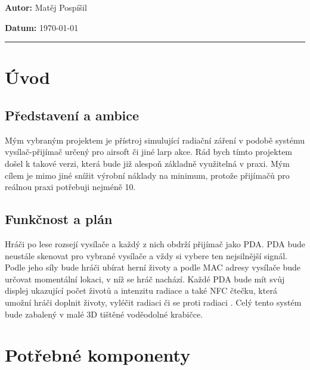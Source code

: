 \documentclass[11pt,a4paper]{article}
\begin{document}

\vspace{0.4em}


\vspace{0.3em}


\vspace{0.7em}

\noindent \textbf{Autor:} Matěj Pospíšil

\noindent \textbf{Datum:} \today

\vspace{1.2em}
\hrule
\vspace{1.7em}

\tableofcontents

\newpage

\section{Úvod}
\subsection{Představení a ambice}
Mým vybraným projektem je přístroj simulující radiační záření v podobě systému vysílač-přijímač určený pro airsoft či jiné larp akce. Rád bych tímto projektem došel k takové verzi, která bude již alespoň základně využitelná v praxi. Mým cílem je mimo jiné snížit výrobní náklady na minimum, protože přijímačů pro reálnou praxi potřebuji nejméně 10.
\subsection{Funkčnost a plán}
Hráči po lese rozsejí vysílače a každý z nich obdrží přijímač jako PDA. PDA bude neustále skenovat pro vybrané vysílače a vždy si vybere ten nejsilnější signál. Podle jeho síly bude hráči ubírat herní životy a podle MAC adresy vysílače bude určovat momentální lokaci, v níž se hráč nachází. Každé PDA bude mít svůj displej ukazující počet životů a intenzitu radiace a také NFC čtečku, která umožní hráči doplnit životy, vyléčit radiaci či se proti radiaci . Celý tento systém bude zabalený v malé 3D tištěné voděodolné krabičce.

\section{Potřebné komponenty}
\end{document}
